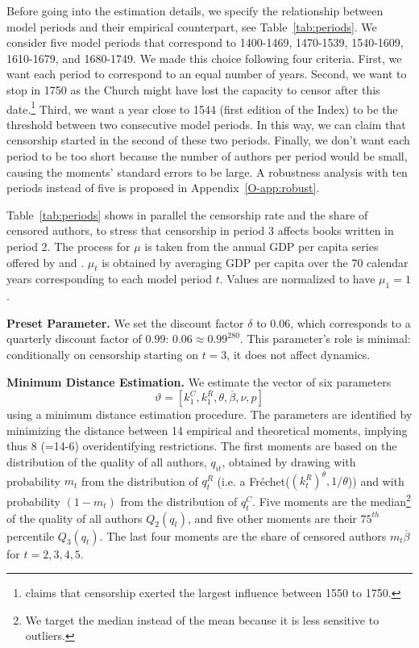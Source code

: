 Before going into the estimation details, we specify the relationship between model periods and their empirical counterpart, see Table~\ref{tab:periods}.
We consider five model periods that correspond to 1400-1469, 1470-1539, 1540-1609, 1610-1679, and 1680-1749. We made this choice following four criteria. First, we want each period to correspond to an equal number of years. Second, we want to stop in 1750 as the Church might have lost the capacity to censor after this date.\footnote{ claims that censorship exerted the largest influence between 1550 to 1750.} Third, we want a year close to 1544 (first edition of the Index) to be the threshold between two consecutive model periods. In this way, we can claim that censorship started in the second of these two periods. Finally, we don't want each period to be too short because the number of authors per period would be small, causing the moments' standard errors to be large. A robustness analysis with ten periods instead of five is proposed in Appendix~\ref{O-app:robust}.




Table~\ref{tab:periods} shows in parallel the censorship rate and the share of censored authors, to stress that censorship in period 3 affects books written in period 2.
The process for $\mu$ is taken from the annual GDP per capita series offered by  and . $\mu_t$ is obtained by averaging GDP per capita over the 70 calendar years corresponding to each model period $t$. Values are normalized to have $\mu_1=1$.

\textbf{Preset Parameter.} We set the discount factor $\delta$ to 0.06, which corresponds to a quarterly discount factor of $0.99$: $0.06\approx0.99^{280}$. This parameter's role is minimal: conditionally on censorship starting on $t=3$, it does not affect dynamics.

\textbf{Minimum Distance Estimation.} We estimate the vector of six parameters
$$\vartheta=[k^C_1,k^R_1,\theta,\overline{\beta},\nu,p]$$
 using a minimum distance estimation procedure. The parameters are identified by minimizing the distance between 14 empirical and theoretical moments, implying thus 8 (=14-6) over\-identifying restrictions.  The first  moments are based on the distribution of the quality of all authors, $q_{it}$, obtained by drawing with probability $m_t$ from the distribution of $q^R_t$ (i.e. a Fréchet($(k_t^R)^\theta,1/\theta$)) and with probability $(1-m_t)$  from the distribution of $q^C_t$.  Five moments are the median\footnote{We target the median instead of the mean because it is less sensitive to outliers.} of the quality of all authors $Q_2(q_t)$, and five other moments are their  $75^{th}$ percentile $Q_3(q_t)$. The last four moments are the share of censored authors $m_t \overline{\beta}$ for $t=2,3,4,5$.

